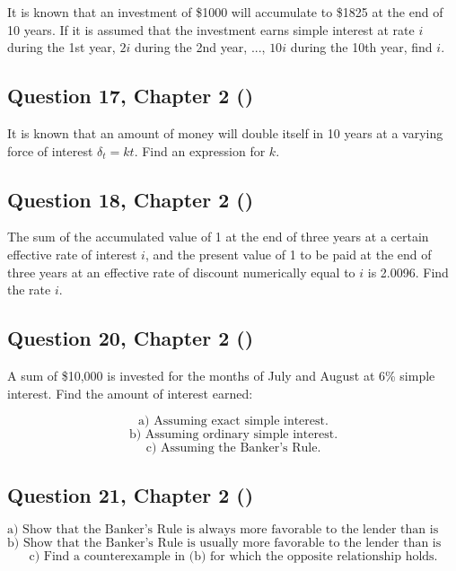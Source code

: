 \documentclass[12pt, a4paper]{article}
\begin{document}
\noindent It is known that an investment of \$1000 will accumulate to \$1825 at the end of 10 years. If it is assumed that the investment earns simple interest at rate \( i \) during the 1st year, \( 2i \) during the 2nd year, ..., \( 10i \) during the 10th year, find \( i \).

\bigskip



\subsection*{Question 17, Chapter 2 (\cite{toi3rd})}

\noindent It is known that an amount of money will double itself in 10 years at a varying force of interest \( \delta_t = kt \). Find an expression for \( k \).

\bigskip



\subsection*{Question 18, Chapter 2 (\cite{toi3rd})}

\noindent The sum of the accumulated value of 1 at the end of three years at a certain effective rate of interest \( i \), and the present value of 1 to be paid at the end of three years at an effective rate of discount numerically equal to \( i \) is 2.0096. Find the rate \( i \).

\bigskip


\subsection*{Question 20, Chapter 2 (\cite{toi3rd})}

\noindent A sum of \$10,000 is invested for the months of July and August at 6\% simple interest. Find the amount of interest earned:

\[
\text{a) Assuming exact simple interest.}
\]
\[
\text{b) Assuming ordinary simple interest.}
\]
\[
\text{c) Assuming the Banker’s Rule.}
\]

    \bigskip


\subsection*{Question 21, Chapter 2 (\cite{toi3rd})}
\[
\text{a) Show that the Banker’s Rule is always more favorable to the lender than is exact simple interest.}
\]
\[
\text{b) Show that the Banker’s Rule is usually more favorable to the lender than is ordinary simple interest.}
\]
\[
\text{c) Find a counterexample in (b) for which the opposite relationship holds.}
\]
\end{document}
